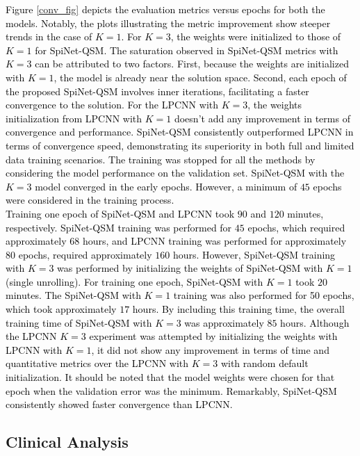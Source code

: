 \documentclass[sn-vancouver,Numbered]{sn-jnl}%
\begin{document}
\textcolor{black}{Figure \ref{conv_fig} depicts the evaluation metrics versus epochs for both the models. Notably, the plots illustrating the metric improvement show steeper trends in the case of $K=1$. For $K=3$, the weights were initialized to those of $K=1$ for SpiNet-QSM. The saturation observed in SpiNet-QSM metrics with $K=3$ can be attributed to two factors. First, because the weights are initialized with $K=1$, the model is already near the solution space. Second, each epoch of the proposed SpiNet-QSM involves inner iterations, facilitating a faster convergence to the solution. For the LPCNN with $K=3$, the weights initialization from LPCNN with $K=1$ doesn't add any improvement in terms of convergence and performance. SpiNet-QSM consistently outperformed LPCNN in terms of convergence speed, demonstrating its superiority in both full and limited data training scenarios.} \textcolor{black}{The training was stopped for all the methods by considering the model performance on the validation set. SpiNet-QSM with the $K=3$ model converged in the early epochs. However, a minimum of $45$ epochs were considered in the training process.
}\\

\noindent \textcolor{black} {Training one epoch of SpiNet-QSM and LPCNN took $90$ and $120$ minutes, respectively. SpiNet-QSM training was performed for $45$ epochs, which required approximately $68$ hours, and LPCNN training was performed for approximately 80 epochs, required approximately $160$ hours. However, SpiNet-QSM training with $K=3$ was performed by initializing the weights of SpiNet-QSM with $K=1$ (single unrolling). For training one epoch, SpiNet-QSM with $K=1$ took $20$ minutes. The SpiNet-QSM with $K=1$ training was also performed for 50 epochs, which took approximately $17$ hours. By including this training time, the overall training time of SpiNet-QSM with $K=3$ was approximately $85$ hours. Although the LPCNN $K=3$ experiment was attempted by initializing the weights with LPCNN with $K=1$, it did not show any improvement in terms of time and quantitative metrics over the LPCNN with $K=3$ with random default initialization. It should be noted that the model weights were chosen for that epoch when the validation error was the minimum. Remarkably, SpiNet-QSM consistently showed faster convergence than LPCNN.}  



\subsection{Clinical Analysis}
\end{document}
